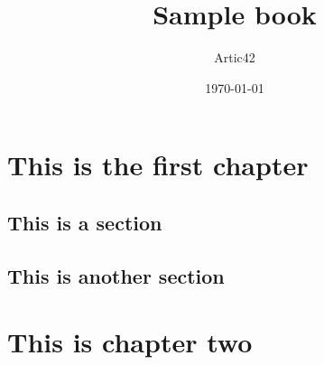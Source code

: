 \def\MYTITLE{Sample book}
\def\MYNAME{Artic42}







    \title{\MYTITLE}
    \author{\MYNAME}
    \date{\today}
    \maketitle


    \tableofcontents
    \thispagestyle{chapterPage}
    \chapter{This is the first chapter}
    \thispagestyle{chapterPage}
    \lipsum[1]
        \section{This is a section}
        \lipsum[5-15]
        \section{This is another section}
        \lipsum[13]
    \chapter{This is chapter two}
    \thispagestyle{chapterPage}
    \lipsum[8-13]
    
